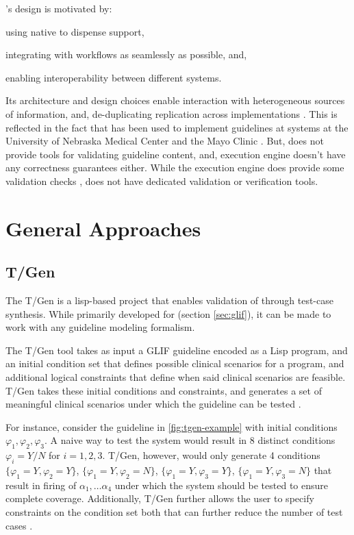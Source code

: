 \SAGE{}'s design is motivated by:
\begin{enumerate*}[label=(\roman*)]
  \item using native \EHR{} to dispense support,
  \item integrating with workflows as seamlessly as possible, and,
  \item enabling interoperability between different \EHR{} systems.
\end{enumerate*}
Its architecture and design choices enable interaction with heterogeneous
sources of information, and, de-duplicating replication across \EHR{}
implementations \cite{TuAMIA07}. This is reflected in the fact that
\SAGE{} has been used to implement guidelines at \EHR{} systems
at the University of Nebraska Medical Center and the Mayo Clinic \cite{TuAMIA07}.
But, \SAGE{} does not provide tools for validating guideline content, and,
execution engine doesn't have any correctness guarantees either. While
the execution engine does provide some validation checks \cite{RamMEDINFO04},
\SAGE{} does not have dedicated validation or verification tools.

\section{General Approaches}\label{sec:general-approaches}

\subsection{T/Gen}

The T/Gen is a lisp-based project that enables validation
of \CIGs{} through test-case synthesis. While
primarily developed for \GLIF{} (section \ref{sec:glif}),
it can be made to work with any guideline modeling formalism.

The T/Gen tool takes as input a GLIF guideline encoded as a
Lisp program, and an initial condition set that defines
possible clinical scenarios for a program, and additional
logical constraints that define when said clinical scenarios are
feasible. T/Gen takes these initial conditions and constraints, and
generates a set of meaningful clinical scenarios under which the
guideline can be tested \cite{MillerJAMIA01}.

For instance, consider the guideline in \figurename{} \ref{fig:tgen-example}
with initial conditions $\varphi_1, \varphi_2, \varphi_3$. A naive
way to test the system would result in 8 distinct conditions $\varphi_i = Y/N$
for $i = 1,2,3$. T/Gen, however, would only generate
4 conditions $\{\varphi_1 = Y, \varphi_2 = Y\}$,
$\{\varphi_1 = Y, \varphi_2 = N\}$, $\{\varphi_1 = Y, \varphi_3 = Y\}$,
$\{\varphi_1 = Y, \varphi_3 = N\}$ that result in firing of $\alpha_1, \dots
\alpha_4$ under which the system should be tested to ensure complete coverage.
Additionally, T/Gen further allows the user to specify constraints on
the condition set both that can further reduce
the number of test cases \cite{MillerJAMIA01}.

